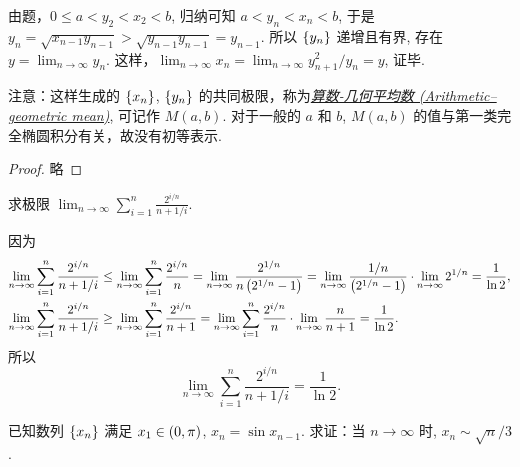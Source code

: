 \begin{solution}
    由题，$0 \le a < y_2 < x_2 < b$, 归纳可知 $a < y_n < x_n < b$, 于是 $y_n = \sqrt{x_{n - 1} y_{n - 1}} >  \sqrt{y_{n - 1} y_{n - 1}} = y_{n - 1}$. 所以 $\set{y_n}$ 递增且有界, 存在 $y = \lim_{n \to \infty} y_n$. 这样，$\lim_{n \to \infty} x_n = \lim_{n \to \infty} y_{n + 1}^2 / y_n = y$, 证毕.
    
    注意：这样生成的 $\set{x_n}$, $\set{y_n}$ 的共同极限，称为\href{https://en.wikipedia.org/wiki/Arithmetic-geometric_mean}{\emph{算数-几何平均数 (Arithmetic–geometric mean)}}, 可记作 $M(a, b)$. 对于一般的 $a$ 和 $b$, $M(a,b)$ 的值与第一类完全椭圆积分有关，故没有初等表示. 
\end{solution}

\begin{proof}
    略
\end{proof}

\begin{exercise}[放缩法]
    求极限 $\displaystyle \lim_{n \to \infty}\sum_{i=1}^{n}\frac{2^{i/n}}{n + 1/i}$.
\end{exercise}

\begin{solution}
    因为
    \begin{align*}
              \lim_{n \to \infty} \sum_{i = 1}^{n} \frac{2^{i/n}}{n + 1/i}
        &\leq \lim_{n \to \infty} \sum_{i = 1}^{n} \frac{2^{i/n}}{n} 
         =    \lim_{n \to \infty} \frac{2^{1/n}}{n \del[1]{2^{1/n} - 1}}
         =    \lim_{n \to \infty} \frac{1/n}{\del[1]{2^{1/n} - 1}}
        \cdot \lim_{n \to \infty} 2^{1/n} 
        =     \frac{1}{\ln 2},\\
              \lim_{n \to \infty} \sum_{i = 1}^{n} \frac{2^{i/n}}{n + 1/i} 
        &\geq \lim_{n \to \infty} \sum_{i = 1}^{n} \frac{2^{i/n}}{n + 1}
         =    \lim_{n \to \infty} \sum_{i = 1}^{n} \frac{2^{i/n}}{n} 
        \cdot \lim_{n \to \infty} \frac{n}{n + 1}
         =    \frac{1}{\ln 2}.
    \end{align*}
    所以
    \[
        \lim_{n \to \infty} \sum_{i = 1}^{n} \frac{2^{i/n}}{n + 1/i} 
        = \frac{1}{\ln 2}.
    \]
\end{solution}

\begin{exercise}
    已知数列 $\set{x_n}$ 满足 $x_1 \in \intoo{0,\pi}$, $x_n = \sin x_{n-1}$. 求证：当 $n \to \infty$ 时, $x_n \sim \sqrt{n}/3$.
\end{exercise}

